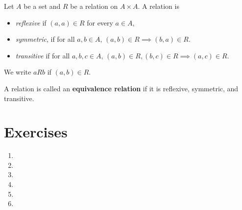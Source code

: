 \begin{definition}
Let $A$ be a set and $R$ be a relation on $A \times A$. A relation is
\begin{itemize}
    \item \textit{reflexive} if $(a, a) \in R$ for every $a \in A$,
    \item \textit{symmetric}, if for all $a, b \in A$, $(a, b) \in R \implies (b, a) \in R$.
    \item \textit{transitive} if for all $a, b, c \in A$, $(a, b) \in R, (b, c) \in R \implies (a, c) \in R$.
\end{itemize}

We write $aRb$ if $(a, b) \in R$.

A relation is called an \textbf{equivalence relation} if it is reflexive, symmetric, and transitive.
\end{definition}

\section{Exercises}

 \begin{enumerate}
   \item 
   \item 
   \item 
   \item 
   \item 
   \item 
 \end{enumerate}

